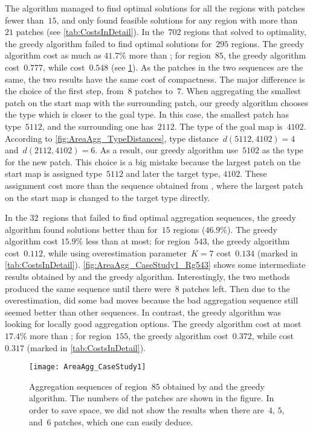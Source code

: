 The \Astar algorithm managed to find optimal solutions 
for all the regions with patches fewer than~$15$,
and only found feasible solutions 
for any region with more than~$21$ patches
(see \tab\ref{tab:CostsInDetail}).
In the~$702$ regions that \Astar solved to optimality,
the greedy algorithm failed to find optimal solutions for~$295$
regions.
The greedy algorithm cost as much as $41.7\%$ more than \Astar; 
for region~$85$, the greedy algorithm cost~$0.777$, while 
\Astar cost~$0.548$
(see \fig\ref{fig:AreaAgg_CaseStudy1_Rg85}).
As the patches in the two sequences are the same,
the two results have the same cost of compactness.
The major difference is the choice of the first step, 
from~$8$ patches to~$7$.
When aggregating the smallest patch on the start map
with the surrounding patch,
our greedy algorithm chooses the type 
which is closer to the goal type.
In this case, the smallest patch has type~$5112$, and the 
surrounding one has~$2112$.
The type of the goal map is~$4102$.
According to \fig\ref{fig:AreaAgg_TypeDistances},
type distance~$d(5112,4102)=4$ and~$d(2112,4102)=6$.
As a result, our greedy algorithm use~$5102$ as the type for the 
new patch. 
This choice is a big mistake because the largest patch on the 
start map is assigned type~$5112$ and later the target type, 
$4102$.
These assignment cost more than the sequence obtained from 
\Astar, where the largest patch on the start map is changed to 
the target type directly.

In the $32$~regions that 
\Astar failed to find optimal aggregation sequences,
the greedy algorithm found solutions better than \Astar 
for~$15$ regions ($46.9\%$).
%
The greedy algorithm cost $15.9\%$ less than \Astar at most; 
for region~$543$, the greedy algorithm cost~$0.112$, while 
\Astar using overestimation parameter~$K=7$ cost~$0.134$
(marked in \tab\ref{tab:CostsInDetail}).
\fig\ref{fig:AreaAgg_CaseStudy1_Rg543} shows 
some intermediate results obtained by
\Astar and the greedy algorithm.
Interestingly, the two methods produced the same sequence until 
there were~$8$ patches left.
Then due to the overestimation, \Astar did some bad moves
because the bad aggregation sequence still seemed better 
than other sequences.
In contrast, the greedy algorithm was looking for locally good 
aggregation options.
%
The greedy algorithm cost at most $17.4\%$ more than \Astar; 
for region~$155$, the greedy algorithm cost~$0.372$, while 
\Astar cost~$0.317$
(marked in \tab\ref{tab:CostsInDetail}).



\begin{figure}[tb]
	\centering
	\texttt{[image: AreaAgg\_CaseStudy1]}
	\caption{Aggregation sequences of region~$85$ 
		obtained by \Astar and the greedy algorithm.
		The numbers of the patches are shown in the figure.
		In order to save space, we did not show the results when 
		there are~$4$, $5$, and~$6$ patches, 
		which one can easily deduce.}
	\label{fig:AreaAgg_CaseStudy1_Rg85}
\end{figure}

